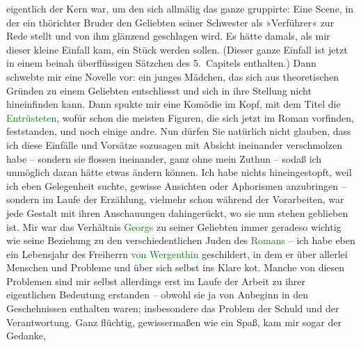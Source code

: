                     eigentlich der Kern war, um den sich allmälig das ganze gruppirte: Eine Scene,
                    in der ein thörichter Bruder den Geliebten seiner Schwester als »Verführer« zur
                    Rede stellt und von ihm glänzend geschlagen wird. Es hätte damals, als mir
                    dieser kleine Einfall kam, ein Stück werden sollen. (Dieser ganze Einfall ist
                    jetzt in einem beinah überflüssigen Sätzchen des 5. Capitels enthalten.) Dann
                    schwebte mir eine Novelle vor: ein junges Mädchen, das sich aus theoretischen
                    Gründen zu einem Geliebten entschliesst und sich in ihre Stellung nicht
                    hineinfinden kann. Dann spukte mir eine Komödie im Kopf, mit dem Titel {\pb}die \textcolor{green}{Entrüsteten}{}, wofür schon die meisten Figuren, die
                    sich jetzt im Roman vorfinden, feststanden, und noch einige andre. Nun dürfen
                    Sie natürlich nicht glauben, dass ich diese Einfälle und Vorsätze sozusagen mit
                    Absicht ineinander verschmolzen habe – sondern sie flossen ineinander, ganz ohne
                    mein Zuthun – sodaß ich unmöglich daran hätte etwas ändern können. Ich habe
                    nichts hineingestopft, weil ich eben Gelegenheit suchte, gewisse Ansichten oder
                    Aphorismen anzubringen – sondern im Laufe der Erzählung, vielmehr schon während
                    der Vorarbeiten, war jede Gestalt mit ihren Anschauungen dahingerückt, wo sie
                    nun stehen geblieben ist. Mir war {\pb}das
                    Verhältnis \textcolor{green}{Georgs}{} zu seiner
                    Geliebten immer geradeso wichtig wie seine Beziehung zu den verschiedentlichen
                    Juden des \textcolor{green}{Romans}{} – ich habe
                    eben ein Lebensjahr des Freiherrn \textcolor{green}{von Wergenthin}{} geschildert, in dem er über allerlei Menschen und
                    Probleme und über sich selbst ins Klare ko{\geminationm}t.
                    Manche von diesen Problemen sind mir selbst allerdings erst im Laufe der Arbeit
                    zu ihrer eigentlichen Bedeutung erstanden – obwohl sie ja von Anbeginn in den
                    Geschehnissen enthalten waren; insbesondere das Problem der Schuld und der
                    Verantwortung. Ganz flüchtig, gewissermaßen {\pb}wie ein Spaß, kam mir sogar der Gedanke,
